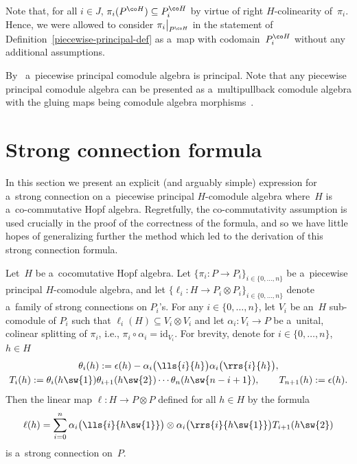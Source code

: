 Note that, for all $i\in J$, $\pi_i(P^{\co H})\subseteq P^{\co H}_i$ by virtue of right $H$-colinearity of~$\pi_i$.
Hence, we were allowed to consider $\pi_i\big|_{P^{\co H}}$ in the statement of
Def\/inition~\ref{piecewise-principal-def} as a~map with codomain~$P^{\co H}_i$ without any additional assumptions.

By~\cite[Corollary~3.9]{hkmz11} a~piecewise principal comodule algebra is principal.
Note that any piecewise principal comodule algebra can be presented as a~multipullback comodule algebra with the gluing
maps being comodule algebra morphisms~\cite{cm2002}.

\section{Strong connection formula}\label{strong-section}

In this section we present an explicit (and arguably simple) expression for a~strong connection on a~piecewise
principal $H$-comodule algebra where~$H$ is a~co-commutative Hopf algebra.
Regretfully, the co-commutativity assumption is used crucially in the proof of the correctness of the formula, and so we
have little hopes of generalizing further the method which led to the derivation of this strong connection formula.

\begin{theorem}
\label{Main}
Let~$H$ be a~cocomutative Hopf algebra.
Let $\{\pi_i:P\rightarrow P_i\}_{i\in\{0,\ldots,n\}}$ be a~piecewise principal $H$-comodule algebra, and let
$\{\ell_i:H\rightarrow P_i\otimes P_i\}_{i\in\{0,\ldots,n\}}$ denote a~family of strong connections on $P_i$'s.
For any $i\in\{0,\ldots,n\}$, let $V_i$ be an~$H$ sub-comodule of $P_i$ such that $\ell_i(H)\subseteq V_i\otimes V_i$
and let $\alpha_i:V_i\rightarrow P$ be a~unital, colinear splitting of $\pi_i$, i.e.,
$\pi_i\circ\alpha_i=\mathrm{id}_{V_i}$.
For brevity, denote for $i\in\{0,\ldots,n\}$, $h\in H$
\begin{gather*}
\theta_i(h):={\epsilon}(h)-\alpha_i\big(\lls{i}{h}\big)\alpha_{i}\big(\rrs{i}{h}\big),
\\
T_i(h):=\theta_i(h\sw{1})\theta_{i+1}(h\sw{2})\cdots\theta_n(h\sw{n-i+1}),
\qquad
T_{n+1}(h):={\epsilon}(h).
\end{gather*}
Then the linear map $\ell:H\rightarrow P\otimes P$ defined for all $h\in H$ by the formula
\begin{gather*}
\ell(h)=\sum\limits_{i=0}^n\alpha_i\big(\lls{i}{h\sw{1}}\big)\otimes\alpha_i\big(\rrs{i}{h\sw{1}}\big)T_{i+1}(h\sw{2})
\end{gather*}
is a~strong connection on~$P$.
\end{theorem}


